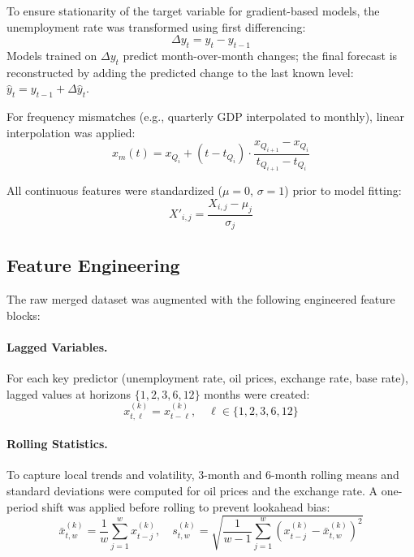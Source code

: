 \documentclass[14pt, a4paper]{extarticle}
\begin{document}
To ensure stationarity of the target variable for gradient-based models, the unemployment rate was transformed using first differencing:
\begin{equation}
    \Delta y_t = y_t - y_{t-1}
    \label{eq:differencing}
\end{equation}
Models trained on $\Delta y_t$ predict month-over-month changes; the final forecast is reconstructed by adding the predicted change to the last known level: $\hat{y}_t = y_{t-1} + \Delta \hat{y}_t$.

For frequency mismatches (e.g., quarterly GDP interpolated to monthly), linear interpolation was applied:
\begin{equation}
    x_{m}(t) = x_{Q_i} + (t - t_{Q_i}) \cdot \frac{x_{Q_{i+1}} - x_{Q_i}}{t_{Q_{i+1}} - t_{Q_i}}
    \label{eq:interpolation}
\end{equation}

All continuous features were standardized ($\mu = 0$, $\sigma = 1$) prior to model fitting:
\begin{equation}
    X'_{i,j} = \frac{X_{i,j} - \mu_j}{\sigma_j}
    \label{eq:standardization}
\end{equation}

\subsection{Feature Engineering}
The raw merged dataset was augmented with the following engineered feature blocks:

\paragraph{Lagged Variables.} For each key predictor (unemployment rate, oil prices, exchange rate, base rate), lagged values at horizons $\{1, 2, 3, 6, 12\}$ months were created:
\begin{equation}
    x^{(k)}_{t,\ell} = x^{(k)}_{t - \ell}, \quad \ell \in \{1, 2, 3, 6, 12\}
\end{equation}

\paragraph{Rolling Statistics.} To capture local trends and volatility, 3-month and 6-month rolling means and standard deviations were computed for oil prices and the exchange rate. A one-period shift was applied before rolling to prevent lookahead bias:
\begin{equation}
    \bar{x}^{(k)}_{t,w} = \frac{1}{w} \sum_{j=1}^{w} x^{(k)}_{t-j}, \quad s^{(k)}_{t,w} = \sqrt{\frac{1}{w-1}\sum_{j=1}^{w} \left(x^{(k)}_{t-j} - \bar{x}^{(k)}_{t,w}\right)^2}
\end{equation}
\end{document}
